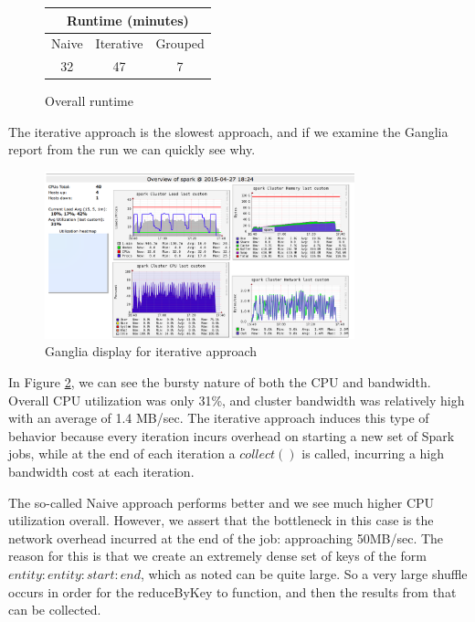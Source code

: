 \documentclass[11pt]{article}
\begin{document}
\begin{figure}[h!]
\centering
\begin{tabular}{ |c|c|c| }
\hline
\multicolumn{3}{|c|}{Runtime (minutes)}\\
\hline
Naive & Iterative & Grouped\\
\hline
32 & 47 & 7\\
\hline
\end{tabular}
\caption{Overall runtime}
\label{runtime}
\end{figure}

The iterative approach is the slowest approach, and if we examine the Ganglia report from the run we can quickly see why. 

\begin{figure}[h!]
\centering
\includegraphics[width=0.8\textwidth]{ganglia_iterative}
\caption{Ganglia display for iterative approach}
\label{fig:ganglia-iterative}
\end{figure}

In Figure \ref{fig:ganglia-iterative}, we can see the bursty nature of both the CPU and bandwidth. Overall CPU utilization was only 31\%, and cluster bandwidth was relatively high with an average of 1.4 MB/sec. The iterative approach induces this type of behavior because every iteration incurs overhead on starting a new set of Spark jobs, while at the end of each iteration a $collect()$ is called, incurring a high bandwidth cost at each iteration. 

The so-called Naive approach performs better and we see much higher CPU utilization overall. However, we assert that the bottleneck in this case is the network overhead incurred at the end of the job: approaching 50MB/sec. The reason for this is that we create an extremely dense set of keys of the form $entity:entity:start:end$, which as noted can be quite large. So a very large shuffle occurs in order for the reduceByKey to function, and then the results from that can be collected.
\end{document}
